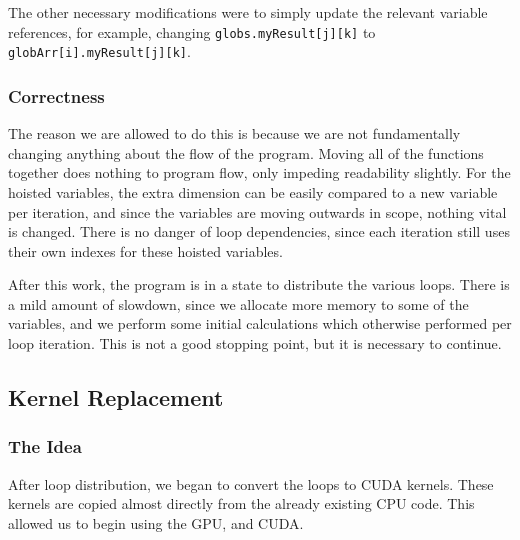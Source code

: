 \documentclass[]{report}
\begin{document}
The other necessary modifications were to simply update the relevant variable references, for example, changing \texttt{globs.myResult[j][k]} to\\ \texttt{globArr[i].myResult[j][k]}.
\subsubsection{Correctness}
The reason we are allowed to do this is because we are not fundamentally changing anything about the flow of the program. Moving all of the functions together does nothing to program flow, only impeding readability slightly. For the hoisted variables, the extra dimension can be easily compared to a new variable per iteration, and since the variables are moving outwards in scope, nothing vital is changed. There is no danger of loop dependencies, since each iteration still uses their own indexes for these hoisted variables.

After this work, the program is in a state to distribute the various loops. There is a mild amount of slowdown, since we allocate more memory to some of the variables, and we perform some initial calculations which otherwise performed per loop iteration. This is not a good stopping point, but it is necessary to continue.
\subsection{Kernel Replacement}
\subsubsection{The Idea}
After loop distribution, we began to convert the loops to CUDA kernels. These kernels are copied almost directly from the already existing CPU code. This allowed us to begin using the GPU, and CUDA.
\end{document}
